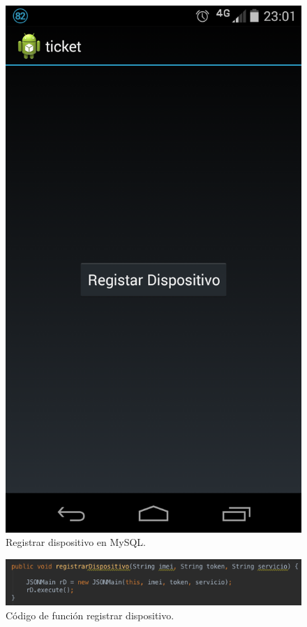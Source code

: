 \begin{figure}[H]
\centering
\includegraphics[scale=0.20]{images/capitulo5/registrarDispositivo.png}
\caption{Registrar dispositivo en MySQL.}
\label{registrarDispositivo}
\end{figure}

\begin{figure}[H]
\centering
\includegraphics[scale=0.70]{images/capitulo5/funcionesAppRD.png}
\caption{Código de función registrar dispositivo.}
\label{registrarDispositivo}
\end{figure}

